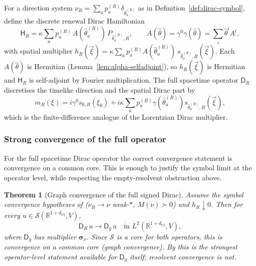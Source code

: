 \documentclass[11pt]{article}
\newtheorem{theorem}{Theorem}[section]
\theoremstyle{definition}
\theoremstyle{remark}
\newcommand{\R}{\mathbb{R}}
\newcommand{\dCl}{d_{\mathrm{Cl}}}
\newcommand{\sym}{\boldsymbol{\sigma}}
\newcommand{\Sch}{\mathcal{S}}
\newcommand{\Dirac}{\mathsf{D}}
\newcommand{\Ham}{\mathsf{H}}
\begin{document}
For a direction system $\nu_R=\sum_a p_a^{(R)}\delta_{\hat\theta_a^{(R)}}$ as in
Definition~\ref{def:dirac-symbol}, define the discrete renewal Dirac Hamiltonian
\[
  \Ham_R=\kappa\sum_a p_a^{(R)}\,A(\hat\theta_a^{(R)})\,P_{\hat\theta_a^{(R)},R},
  \qquad A(\hat\theta)=\gamma^0\gamma(\hat\theta)=\textstyle\sum_i\hat\theta^i A^i,
\]
with spatial multiplier $h_R(\vec\xi)=\kappa\sum_a p_a^{(R)}
A(\hat\theta_a^{(R)})\,s_{\hat\theta_a^{(R)},R}(\vec\xi)$.  Each
$A(\hat\theta)$ is Hermitian (Lemma~\ref{lem:alpha-selfadjoint}), so $h_R(\vec\xi)$ is
Hermitian and $\Ham_R$ is self-adjoint by Fourier multiplication.  The full
spacetime operator $\Dirac_R$ discretises the timelike direction and the spatial
Dirac part by
\[
  m_R(\xi)=i\gamma^0s_{0,R}(\xi_0)
  +i\kappa\sum_a p_a^{(R)}\gamma(\hat\theta_a^{(R)})
    s_{\hat\theta_a^{(R)},R}(\vec\xi),
\]
which is the finite-difference analogue of the Lorentzian Dirac multiplier.

\subsubsection{Strong convergence of the full operator}

For the full spacetime Dirac operator the correct convergence statement is
convergence on a common core.  This is enough to justify the symbol limit at the
operator level, while respecting the empty-resolvent obstruction above.

\begin{theorem}[Graph convergence of the full signed Dirac]
\label{thm:full-operator}
Assume the symbol convergence hypotheses of 
($\nu_R\to\nu$ weak-$*$, $M(\nu)\succ0$) and $h_R\downarrow0$.  Then for every
$u\in\Sch(\R^{1+\dCl},V)$,
\[
  \Dirac_R\,u\longrightarrow \Dirac_g\,u\quad\text{in }L^2(\R^{1+\dCl},V),
\]
where $\Dirac_g$ has multiplier $\sym_\nu$.  Since $\Sch$ is a core for both
operators, this is convergence on a common core (graph convergence).  By
 this is the strongest operator-level statement
available for $\Dirac_g$ itself; resolvent convergence is not.
\end{theorem}
\end{document}
